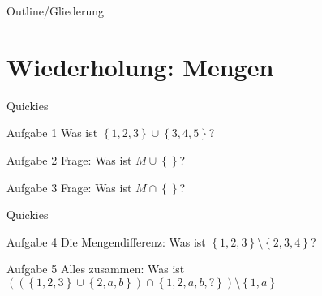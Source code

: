
\subtitle{Foliensatz 3}
\date{8. November 2012}



\begin{frame}
    \titlepage
\end{frame}

\begin{frame}{Outline/Gliederung}
    \tableofcontents
\end{frame}

\section{Wiederholung: Mengen}
\begin{frame}{Quickies}
    \begin{exampleblock}{Aufgabe 1}
        Was ist $\left\{ 1, 2, 3\right\} \cup \left\{ 3, 4, 5\right\}$?\\
        \pause
    \end{exampleblock}
    \begin{exampleblock}{Aufgabe 2}
        Frage: Was ist $ M \cup \left\{\right\}$?\\
        \pause
    \end{exampleblock}
    \begin{exampleblock}{Aufgabe 3}
        Frage: Was ist $M \cap \left\{\right\}$?\\
        \pause
    \end{exampleblock}
\end{frame}

\begin{frame}{Quickies}
    \begin{exampleblock}{Aufgabe 4}
        Die Mengendifferenz: Was ist $\left\{ 1, 2, 3\right\} \setminus \left\{ 2, 3, 4\right\}$?\\
        \pause
    \end{exampleblock}
    \begin{exampleblock}{Aufgabe 5}
        Alles zusammen: Was ist $\left(\left(\left\{ 1, 2, 3\right\} \cup \left\{ 2, a, b\right\}\right) \cap \left\{ 1, 2, a, b, ?\right\}\right) \setminus \left\{ 1, a\right\}$\\
        \pause
    \end{exampleblock}
\end{frame}


